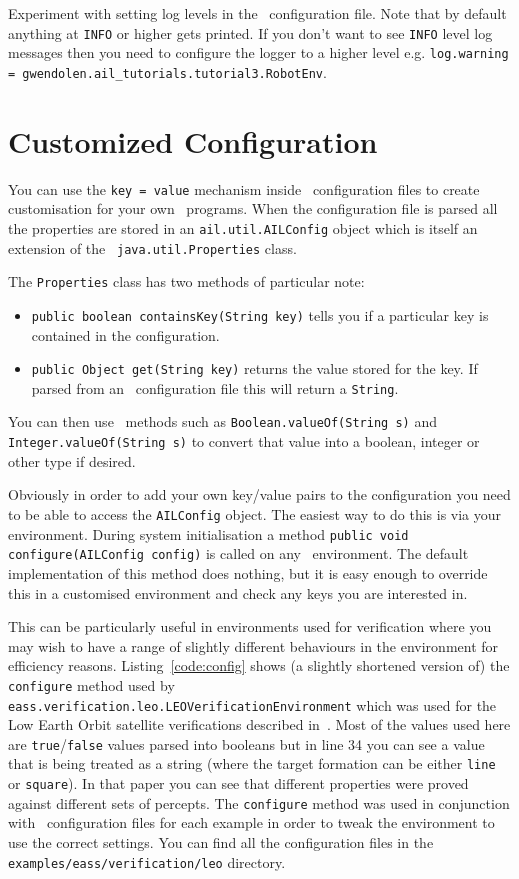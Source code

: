\documentclass[a4]{article}
\begin{document}
Experiment with setting log levels in the \ail\ configuration file.  Note that by default anything at \texttt{INFO} or higher gets printed.  If you don't want to see \texttt{INFO} level log messages then you need to configure the logger to a higher level e.g. \texttt{log.warning = gwendolen.ail\_tutorials.tutorial3.RobotEnv}.

\section{Customized Configuration}

You can use the \texttt{key = value} mechanism inside \ail\ configuration files to create customisation for your own \ail\ programs.  When the configuration file is parsed all the properties are stored in an \texttt{ail.util.AILConfig} object which is itself an extension of the \java\ \texttt{java.util.Properties} class.  

The \texttt{Properties} class has two methods of particular note:
\begin{itemize}
\item \texttt{public boolean containsKey(String key)} tells you if a particular key is contained in the configuration.  
\item \texttt{public Object get(String key)} returns the value stored for the key.  If parsed from an \ail\ configuration file this will return a \texttt{String}.
\end{itemize}
You can then use \java\ methods such as \texttt{Boolean.valueOf(String s)} and \texttt{Integer.valueOf(String s)} to convert that value into a boolean, integer or other type if desired.

Obviously in order to add your own key/value pairs to the configuration you need to be able to access the \texttt{AILConfig} object.  The easiest way to do this is via your environment.  During system initialisation a method \texttt{public void configure(AILConfig config)} is called on any \ail\ environment.  The default implementation of this method does nothing, but it is easy enough to override this in a customised environment and check any keys you are interested in.

This can be particularly useful in environments used for verification where you may wish to have a range of slightly different behaviours in the environment for efficiency reasons.  Listing~\ref{code:config} shows (a slightly shortened version of) the \texttt{configure} method used by \texttt{eass.verification.leo.LEOVerificationEnvironment} which was used for the Low Earth Orbit satellite verifications described in~\cite{dennis14:_pract}.  Most of the values used here are \texttt{true}/\texttt{false} values parsed into booleans but in line 34 you can see a value that is being treated as a string (where the target formation can be either \texttt{line} or \texttt{square}).  In that paper you can see that different properties were proved against different sets of percepts.  The \texttt{configure} method was used in conjunction with \ail\ configuration files for each example in order to tweak the environment to use the correct settings.  You can find all the configuration files in the \texttt{examples/eass/verification/leo} directory.
\end{document}
